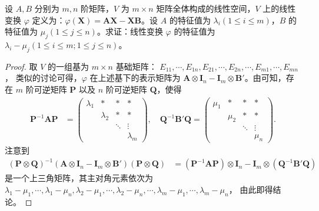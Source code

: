 \documentclass[../../main.tex]{subfiles}
\begin{document}
\begin{proposition}\label{proposition:线性变换AX-XB的表示矩阵和特征值}
设 $A,B$ 分别为 $m,n$ 阶矩阵，$V$ 为 $m \times n$ 矩阵全体构成的线性空间，$V$ 上的线性变换 $\varphi$ 定义为：$\varphi(\boldsymbol{X}) = \boldsymbol{AX} - \boldsymbol{XB}$。设 $A$ 的特征值为 $\lambda_i (1 \leqslant  i \leqslant  m)$，$B$ 的特征值为 $\mu_j (1 \leqslant  j \leqslant  n)$。求证：线性变换 $\varphi$ 的特征值为 $\lambda_i - \mu_j (1 \leqslant  i \leqslant  m; 1 \leqslant  j \leqslant  n)$。
\end{proposition}
\begin{proof}
取 $V$ 的一组基为 $m \times n$ 基础矩阵：
$E_{11},\cdots, E_{1n}, E_{21},\cdots, E_{2n},\cdots, E_{m1},\cdots, E_{mn}$，
类似的讨论可得，$\varphi$ 在上述基下的表示矩阵为 $\boldsymbol{A} \otimes \boldsymbol{I}_n - \boldsymbol{I}_m \otimes \boldsymbol{B}'$。由可知，存在 $m$ 阶可逆矩阵 $\boldsymbol{P}$ 以及 $n$ 阶可逆矩阵 $\boldsymbol{Q}$，使得
\begin{align*}
\boldsymbol{P}^{-1}\boldsymbol{AP} &= 
\begin{pmatrix}
\lambda_1 & * & * & * \\
 & \lambda_2 & * & * \\
 & & \ddots & \vdots \\
 & & & \lambda_m
\end{pmatrix}, \quad
\boldsymbol{Q}^{-1}\boldsymbol{B}'\boldsymbol{Q} = 
\begin{pmatrix}
\mu_1 & * & * & * \\
 & \mu_2 & * & * \\
 & & \ddots & \vdots \\
 & & & \mu_n
\end{pmatrix}.
\end{align*}
注意到
\begin{align*}
(\boldsymbol{P} \otimes \boldsymbol{Q})^{-1}(\boldsymbol{A} \otimes \boldsymbol{I}_n - \boldsymbol{I}_m \otimes \boldsymbol{B}')(\boldsymbol{P} \otimes \boldsymbol{Q}) 
&= (\boldsymbol{P}^{-1}\boldsymbol{AP}) \otimes \boldsymbol{I}_n - \boldsymbol{I}_m \otimes (\boldsymbol{Q}^{-1}\boldsymbol{B}'\boldsymbol{Q})
\end{align*}
是一个上三角矩阵，其主对角元素依次为
$\lambda_1 - \mu_1,\cdots, \lambda_1 - \mu_n, \lambda_2 - \mu_1,\cdots, \lambda_2 - \mu_n,\cdots, \lambda_m - \mu_1,\cdots, \lambda_m - \mu_n$，
由此即得结论。

\end{proof}
\end{document}
